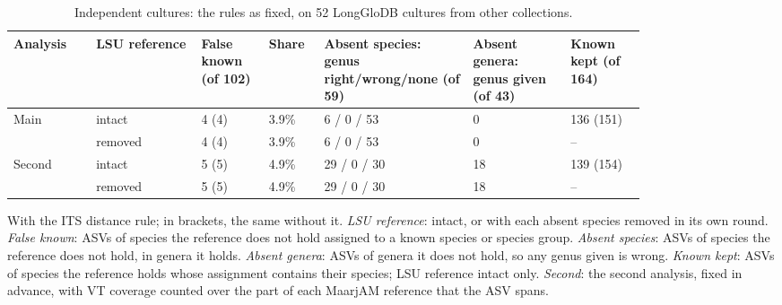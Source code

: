 \begin{table}[htbp]\centering
\begin{threeparttable}
\caption{Independent cultures: the rules as fixed, on 52 LongGloDB cultures from other collections.}
\label{tab:lgdb}
\footnotesize\setlength{\tabcolsep}{4pt}
\begin{tabular}{L{0.11\linewidth}L{0.14\linewidth}L{0.09\linewidth}L{0.06\linewidth}L{0.19\linewidth}L{0.13\linewidth}L{0.10\linewidth}}
\toprule
Analysis & LSU reference & False known (of 102) & Share & Absent species: genus right/wrong/none (of 59) & Absent genera: genus given (of 43) & Known kept (of 164)\\
\midrule
Main & intact & 4 (4) & 3.9\% & 6 / 0 / 53 & 0 & 136 (151)\\
 & removed & 4 (4) & 3.9\% & 6 / 0 / 53 & 0 & --\\
Second & intact & 5 (5) & 4.9\% & 29 / 0 / 30 & 18 & 139 (154)\\
 & removed & 5 (5) & 4.9\% & 29 / 0 / 30 & 18 & --\\
\bottomrule
\end{tabular}
\begin{tablenotes}\footnotesize
\item With the ITS distance rule; in brackets, the same without it. \emph{LSU reference}: intact, or with each absent
species removed in its own round. \emph{False known}: ASVs of species the reference
does not hold assigned to a known species or species group. \emph{Absent species}: ASVs of species the reference does not
hold, in genera it holds. \emph{Absent genera}: ASVs of genera it does not hold, so any genus given is wrong.
\emph{Known kept}: ASVs of species the reference holds whose assignment contains their species; LSU reference intact
only. \emph{Second}: the second analysis, fixed in advance, with VT coverage counted over the part of each MaarjAM
reference that the ASV spans.
\end{tablenotes}
\end{threeparttable}
\end{table}
